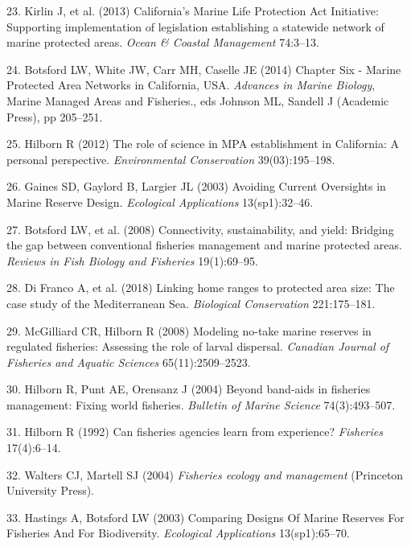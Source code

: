 \documentclass[9pt,twocolumn,twoside,lineno]{pnas-new}
\begin{document}
\leavevmode\hypertarget{ref-kirlin2013}{}%
23. Kirlin J, et al. (2013) California's Marine Life Protection Act
Initiative: Supporting implementation of legislation establishing a
statewide network of marine protected areas. \emph{Ocean \& Coastal
Management} 74:3--13.

\leavevmode\hypertarget{ref-botsford2014}{}%
24. Botsford LW, White JW, Carr MH, Caselle JE (2014) Chapter Six -
Marine Protected Area Networks in California, USA. \emph{Advances in
Marine Biology}, Marine Managed Areas and Fisheries., eds Johnson ML,
Sandell J (Academic Press), pp 205--251.

\leavevmode\hypertarget{ref-hilborn2012}{}%
25. Hilborn R (2012) The role of science in MPA establishment in
California: A personal perspective. \emph{Environmental Conservation}
39(03):195--198.

\leavevmode\hypertarget{ref-gaines2003}{}%
26. Gaines SD, Gaylord B, Largier JL (2003) Avoiding Current Oversights
in Marine Reserve Design. \emph{Ecological Applications} 13(sp1):32--46.

\leavevmode\hypertarget{ref-botsford2008}{}%
27. Botsford LW, et al. (2008) Connectivity, sustainability, and yield:
Bridging the gap between conventional fisheries management and marine
protected areas. \emph{Reviews in Fish Biology and Fisheries}
19(1):69--95.

\leavevmode\hypertarget{ref-difranco2018}{}%
28. Di Franco A, et al. (2018) Linking home ranges to protected area
size: The case study of the Mediterranean Sea. \emph{Biological
Conservation} 221:175--181.

\leavevmode\hypertarget{ref-mcgilliard2008}{}%
29. McGilliard CR, Hilborn R (2008) Modeling no-take marine reserves in
regulated fisheries: Assessing the role of larval dispersal.
\emph{Canadian Journal of Fisheries and Aquatic Sciences}
65(11):2509--2523.

\leavevmode\hypertarget{ref-hilborn2004}{}%
30. Hilborn R, Punt AE, Orensanz J (2004) Beyond band-aids in fisheries
management: Fixing world fisheries. \emph{Bulletin of Marine Science}
74(3):493--507.

\leavevmode\hypertarget{ref-hilborn1992}{}%
31. Hilborn R (1992) Can fisheries agencies learn from experience?
\emph{Fisheries} 17(4):6--14.

\leavevmode\hypertarget{ref-walters2004}{}%
32. Walters CJ, Martell SJ (2004) \emph{Fisheries ecology and
management} (Princeton University Press).

\leavevmode\hypertarget{ref-hastings2003}{}%
33. Hastings A, Botsford LW (2003) Comparing Designs Of Marine Reserves
For Fisheries And For Biodiversity. \emph{Ecological Applications}
13(sp1):65--70.
\end{document}
